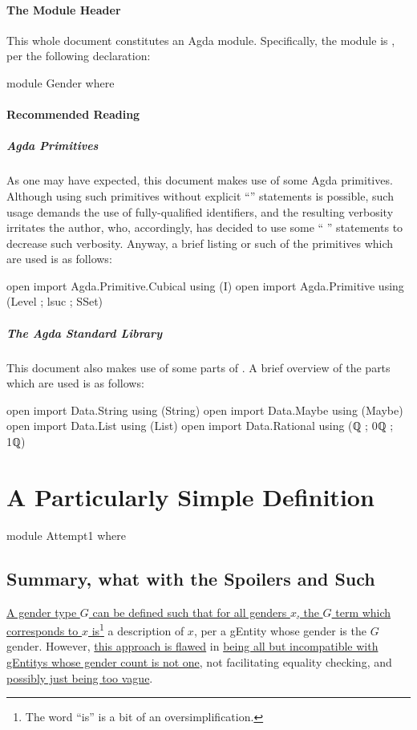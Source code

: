 \documentclass{article}
\theoremstyle{remark}
\newcommand{\summaryLink}[2]{\hyperref[#1]{#2}}
\begin{document}
\paragraph{The Module Header}
This whole document constitutes an Agda module.  Specifically, the module is , per the following declaration:

\begin{code}
module Gender where
\end{code}

\paragraph{Recommended Reading}

\subparagraph{Agda Primitives}
As one may have expected, this document makes use of some Agda primitives.  Although using such primitives without explicit ``'' statements is possible, such usage demands the use of fully-qualified identifiers, and the resulting verbosity irritates the author, who, accordingly, has decided to use some `` '' statements to decrease such verbosity.  Anyway, a brief listing or such of the primitives which are used is as follows:

\begin{code}
open import Agda.Primitive.Cubical using (I)
open import Agda.Primitive using (Level ; lsuc ; SSet)
\end{code}

\subparagraph{The Agda Standard Library}
This document also makes use of some parts of \textcite{agdaStdlib}.  A brief overview of the parts which are used is as follows:

\begin{code}
open import Data.String using (String)
open import Data.Maybe using (Maybe)
open import Data.List using (List)
open import Data.Rational using (ℚ ; 0ℚ ; 1ℚ)
\end{code}

\section{A Particularly Simple Definition}

\begin{code}
module Attempt1 where
\end{code}

\subsection{Summary, what with the Spoilers and Such}
\summaryLink{sec:gender1definition}{A gender type \(G\) can be defined such that for all genders \(x\), the \(G\) term which corresponds to \(x\) is\footnote{The word ``is'' is a bit of an oversimplification.} a description of \(x\), per a \gls{gEntity} whose gender is the \(G\) gender.}  However, \summaryLink{sec:gender1flaws}{this approach is flawed} in \summaryLink{sec:gender1non1gender}{being all but incompatible with \glspl{gEntity} whose gender count is not one}, not facilitating equality checking, and \summaryLink{sec:gender1vagueness}{possibly just being too vague}.
\end{document}
